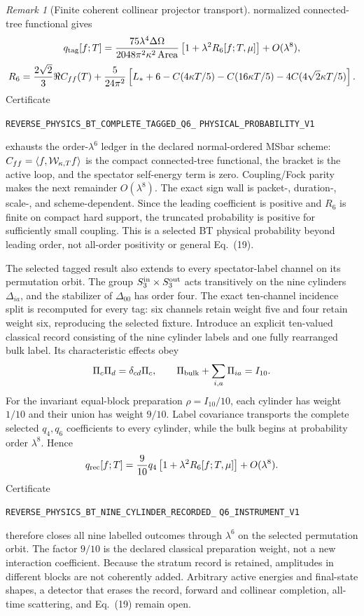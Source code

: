 \documentclass[11pt]{article}
\theoremstyle{definition}
\theoremstyle{remark}
\newtheorem{remark}[theorem]{Remark}
\begin{document}
\begin{remark}[Finite coherent collinear projector transport]
normalized connected-tree functional gives
\[
 q_{\rm tag}[f;T]
 ={75\lambda^4\Delta\Omega\over
 2048\pi^2\kappa^2\operatorname{Area}}
 \left[1+\lambda^2R_6[f;T,\mu]\right]+O(\lambda^8),
\]
\[
 R_6={2\sqrt2\over3}\Re C_{ff}(T)
 +{5\over24\pi^2}\left[L_*+6-C(4\kappa T/5)
 -C(16\kappa T/5)-4C(4\sqrt2\kappa T/5)\right].
\]
Certificate
\par\noindent
\texttt{REVERSE\_PHYSICS\_BT\_COMPLETE\_TAGGED\_Q6\_}
\allowbreak\texttt{PHYSICAL\_PROBABILITY\_V1}
\par\noindent
exhausts the order-$\lambda^6$ ledger in the declared normal-ordered MSbar
scheme: $C_{ff}=\langle f,{\cal W}_{\kappa,T}f\rangle$ is the compact
connected-tree functional, the bracket is the active loop, and the spectator
self-energy term is zero.  Coupling/Fock parity makes the next remainder
$O(\lambda^8)$.  The exact sign wall is packet-, duration-, scale-, and
scheme-dependent.  Since the leading coefficient is positive and $R_6$ is
finite on compact hard support, the truncated probability is positive for
sufficiently small coupling.  This is a selected BT physical probability
beyond leading order, not all-order positivity or general Eq.~(19).

The selected tagged result also extends to every spectator-label channel on
its permutation orbit.  The group
$S_3^{\rm in}\times S_3^{\rm out}$ acts transitively on the nine cylinders
$\Delta_{ia}$, and the stabilizer of $\Delta_{00}$ has order four.  The exact
ten-channel incidence split is recomputed for every tag: six channels retain
weight five and four retain weight six, reproducing the selected fixture.
Introduce an explicit ten-valued classical record consisting of the nine
cylinder labels and one fully rearranged bulk label.  Its characteristic
effects obey
\[
 \Pi_c\Pi_d=\delta_{cd}\Pi_c,
 \qquad
 \Pi_{\rm bulk}+\sum_{i,a}\Pi_{ia}=I_{10}.
\]
For the invariant equal-block preparation $\rho=I_{10}/10$, each cylinder has
weight $1/10$ and their union has weight $9/10$.  Label covariance transports
the complete selected $q_4,q_6$ coefficients to every cylinder, while the
bulk begins at probability order $\lambda^8$.  Hence
\[
 q_{\rm rec}[f;T]
 ={9\over10}q_4\left[1+\lambda^2R_6[f;T,\mu]\right]
 +O(\lambda^8).
\]
Certificate
\par\noindent
\texttt{REVERSE\_PHYSICS\_BT\_NINE\_CYLINDER\_RECORDED\_}
\allowbreak\texttt{Q6\_INSTRUMENT\_V1}
\par\noindent
therefore closes all nine labelled outcomes through $\lambda^6$ on the
selected permutation orbit.  The factor $9/10$ is the declared classical
preparation weight, not a new interaction coefficient.  Because the stratum
record is retained, amplitudes in different blocks are not coherently added.
Arbitrary active energies and final-state shapes, a detector that erases the
record, forward and collinear completion, all-time scattering, and
Eq.~(19) remain open.


\end{remark}
\end{document}
